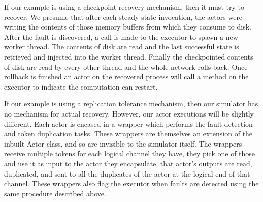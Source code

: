 If our example is using a checkpoint recovery mechanism, then it must try to recover.
We presume that after each steady state invocation, the actors were writing the contents of those memory buffers from which they consume to disk.
After the fault is discovered, a call is made to the executor to spawn a new worker thread.
The contents of disk are read and the last successful state is retrieved and injected into the worker thread.
Finally the checkpointed contents of disk are read by every other thread and the whole network rolls back.
Once rollback is finished an actor on the recovered process will call a method on the executor to indicate the computation can restart.

If our example is using a replication tolerance mechanism, then our simulator has no mechanism for actual recovery.
However, our actor executions will be slightly different.
Each actor is encased in a wrapper which performs the fault detection and token duplication tasks.
These wrappers are themselves an extension of the inbuilt Actor class, and so are invisible to the simulator itself.
The wrappers receive multiple tokens for each logical channel they have, they pick one of those and use it as input to the actor they encapsulate, that actor's outputs are read, duplicated, and sent to all the duplicates of the actor at the logical end of that channel.
These wrappers also flag the executor when faults are detected using the same procedure described above.

